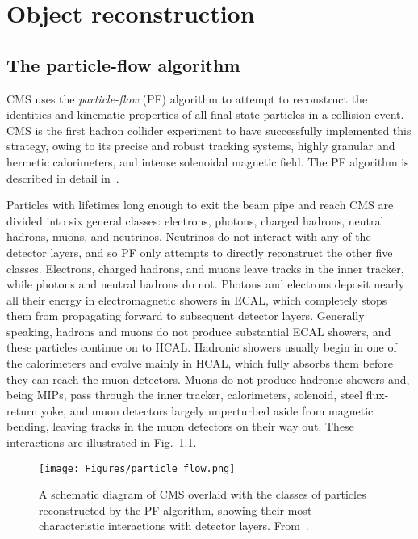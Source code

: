 \chapter{Object reconstruction} \label{chap:reconstruction}
\section{The particle-flow algorithm} \label{sec:reconstruction_particle_flow}
CMS uses the \textit{particle-flow} (PF) algorithm to attempt to reconstruct the identities and kinematic properties of all final-state particles in
a collision event. CMS is the first hadron collider experiment to have successfully implemented this strategy,
owing to its precise and robust tracking systems, highly granular and hermetic calorimeters, and intense solenoidal magnetic field.
The PF algorithm is described in detail in~\cite{ref:1748-0221/12/10/P10003}.

Particles with lifetimes long enough to exit the beam pipe and reach CMS are divided into six general classes:
electrons, photons, charged hadrons, neutral hadrons, muons, and neutrinos.
Neutrinos do not interact with any of the detector layers, and so PF only attempts to directly reconstruct the other five classes.
Electrons, charged hadrons, and muons leave tracks in the inner tracker, while photons and neutral hadrons do not. Photons and electrons
deposit nearly all their energy in electromagnetic showers in ECAL, which completely stops them from propagating forward to subsequent
detector layers. Generally speaking, hadrons and muons do not produce substantial ECAL showers, and these particles continue on to HCAL.
Hadronic showers usually begin in one of the calorimeters and evolve mainly in HCAL, which fully absorbs them before they can reach the muon detectors.
Muons do not produce hadronic showers and, being MIPs, pass through the inner tracker, calorimeters, solenoid, steel flux-return yoke,
and muon detectors largely unperturbed aside from magnetic bending, leaving tracks in the muon detectors on their way out.
These interactions are illustrated in Fig.~\ref{fig:particle_flow}.

\begin{figure}[hbtp]
  \begin{center}
    \texttt{[image: Figures/particle\_flow.png]}
    \caption{
    A schematic diagram of CMS overlaid with
    the classes of particles reconstructed by the PF algorithm, showing their most
    characteristic interactions with detector layers.
    From~\cite{ref:1748-0221/12/10/P10003}.
    }
    \label{fig:particle_flow}
  \end{center}
\end{figure}

